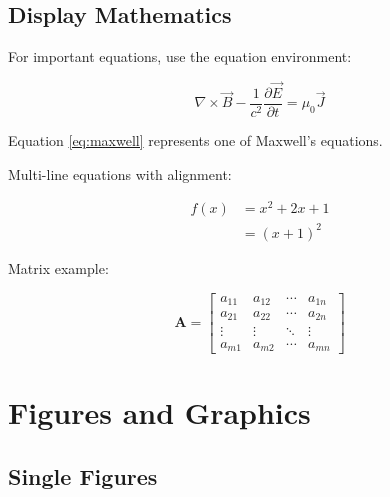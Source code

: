 \subsection*{Display Mathematics}
\label{subsec:display_math}

For important equations, use the equation environment:

\begin{equation}
	\nabla \times \vec{B} - \frac{1}{c^2}\frac{\partial \vec{E}}{\partial t}
	= \mu_0 \vec{J}
	\label{eq:maxwell}
\end{equation}

Equation \eqref{eq:maxwell} represents one of Maxwell's equations.

Multi-line equations with alignment:

\begin{align}
	f(x) & = x^2 + 2x + 1 \label{eq:function} \\
	     & = (x + 1)^2 \label{eq:factored}
\end{align}

Matrix example:

\begin{equation}
	\mathbf{A} = \begin{bmatrix}
		a_{11} & a_{12} & \cdots & a_{1n} \\
		a_{21} & a_{22} & \cdots & a_{2n} \\
		\vdots & \vdots & \ddots & \vdots \\
		a_{m1} & a_{m2} & \cdots & a_{mn}
	\end{bmatrix}
	\label{eq:matrix}
\end{equation}

\section{Figures and Graphics}
\label{sec:figures}

\subsection*{Single Figures}
\label{subsec:single_figures}

